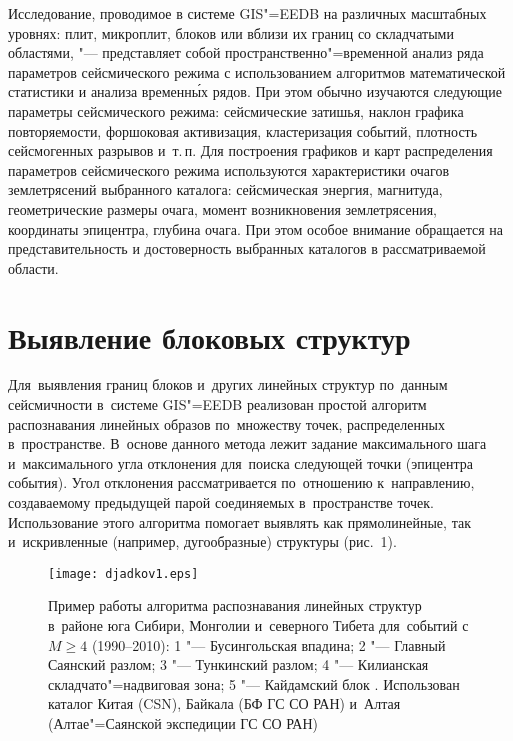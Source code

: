 \documentclass[twoside]{article}
\begin{document}
Исследование, проводимое в системе GIS"=EEDB на различных масштабных уровнях: плит,
микроплит, блоков или вблизи их границ со склад\-чатыми областями, "--- представляет собой
пространственно"=временной анализ ряда параметров сейсмического режима с использованием
алгоритмов математической статистики и анализа временн\'{ы}х рядов.
При этом обычно
изучаются следующие параметры сейсмического режима: сейс\-ми\-че\-ские за\-тишья, наклон
графика пов\-то\-ря\-емости, форшоковая активизация, кластеризация событий, плотность
сейсмогенных разрывов и~т.\,п.
Для \mbox{построения} графиков и карт распределения параметров
сейсмического режима используются характеристики очагов землетрясений выбранного
каталога: сейсмическая энергия, магнитуда, геометрические размеры очага, момент
возникновения землетрясения, координаты эпицентра, глубина очага.
При этом особое
внимание обращается на представительность и достоверность выбранных каталогов
в рас\-смат\-ри\-ва\-емой области.

\section{Выявление блоковых структур}
Для~выявления границ блоков и~других линейных структур по~данным сейсмичности в~системе
GIS"=EEDB реализован простой алгоритм распознавания линейных образов по~множеству
точек, распределенных в~пространстве.
В~основе данного \mbox{метода} лежит задание максимального
шага и~максимального угла отклонения  для~поиска сле\-ду\-ющей точки (эпицентра события).
Угол отклонения рассматривается по~отношению к~нап\-равлению, создаваемому предыдущей парой
соединяемых в~пространстве точек.
Использование этого алгоритма помогает выявлять как
прямолинейные, так и~искривленные (например, дугообразные) структуры (рис.~1).

\begin{figure}[t]
\texttt{[image: djadkov1.eps]}
\caption{Пример работы алгоритма распознавания линейных структур в~районе
юга Сибири, Монголии и~северного Тибета для~событий с $M\geq4$ (1990--2010): 1 "--- Бусингольская впадина;
2 "--- Главный Саянский \mbox{разлом}; 3 "--- Тункинский разлом; 4 "--- Килианская складчато"=надвиговая зона;
5 "--- Кайдамский блок \cite{lysak}. Использован каталог Китая (CSN), Байкала (БФ ГС СО РАН)
и~Алтая (Алтае"=Саянской экспедиции ГС СО РАН)}
\end{figure}
\end{document}
